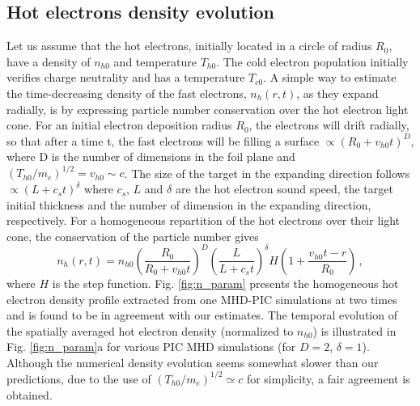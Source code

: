 \documentclass[aps,showpacs,superscriptaddress]{revtex4}
\begin{document}
\subsection{Hot electrons density evolution}
Let us assume that the hot electrons, initially located in a circle of radius $R_0$, have a density of $n_{h0}$ and temperature $T_{h0}$. The cold electron  population initially verifies charge neutrality and has a temperature $T_{c0}$.
A simple way to estimate the time-decreasing density of the fast electrons, $n_h(r,t)$, as they expand radially, is by expressing particle number conservation over the hot electron light cone.
For an initial electron  deposition radius $R_0$, the electrons will drift radially, so that after a time t, the fast electrons will be  filling a surface $\propto ( R_0 + v_{h0}t)^D$, where D is the number of dimensions in the foil plane and $(T_{h0}/m_e)^{1/2}= v_{h0}\sim c$.
The size of the target in the expanding direction follows $\propto (L+c_st)^\delta$ where $c_s$, $L$ and $\delta$ are  the hot electron sound speed, the target initial thickness and the number of dimension in the expanding direction, respectively. 
For a homogeneous repartition of the hot electrons over their light cone, the conservation of the particle number gives
\begin{equation} \label{eq:nt}
n_h(r,t)  = n_{h0} \left( \frac{R_0}{R_0 + v_{h0}t } \right)^D \left( \frac{L}{L + c_{s}t } \right)^\delta  H \left( 1 + \frac{v_{h0}t-r}{R_0} \right) \, ,
\end{equation}
where $H$ is the step function.
Fig.  \ref{fig:n_param} presents the  homogeneous  hot electron density profile extracted from one  MHD-PIC simulations at two times  and is found to be in agreement with our estimates.
The temporal evolution of the spatially averaged hot electron density (normalized to $n_{h0}$) is illustrated in Fig. \ref{fig:n_param}a for various PIC MHD simulations (for $D=2$, $\delta=1$). Although the numerical density evolution seems somewhat slower than our predictions, due to the use of   $(T_{h0}/m_e)^{1/2} \simeq c$ for simplicity, a fair agreement is obtained.
\end{document}
